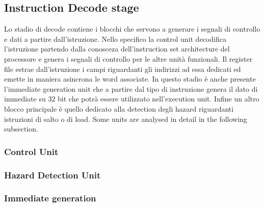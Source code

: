 \subsection{Instruction Decode stage}
Lo stadio di decode contiene i blocchi che servono a generare i segnali di controllo e dati a partire dall'istruzione. Nello specifico la control unit decodifica l'istruzione partendo dalla conosceza dell'instruction set architecture del processore e genera i segnali di controllo per le altre unità funzionali. Il register file estrae dall'istruzione i campi riguardanti gli indirizzi ad essa dedicati ed emette in maniera asincrona le word associate. In questo stadio è anche presente l'immediate generation unit che a partire dal tipo di instruzione genera il dato di immediate su 32 bit che potrà essere utilizzato nell'execution unit. Infine un altro blocco principale è quello dedicato alla detection degli hazard riguardanti istruzioni di salto o di load. Some units are analysed in detail in the following subsection.

\subsubsection{Control Unit}

\subsubsection{Hazard Detection Unit}

\subsubsection{Immediate generation }
